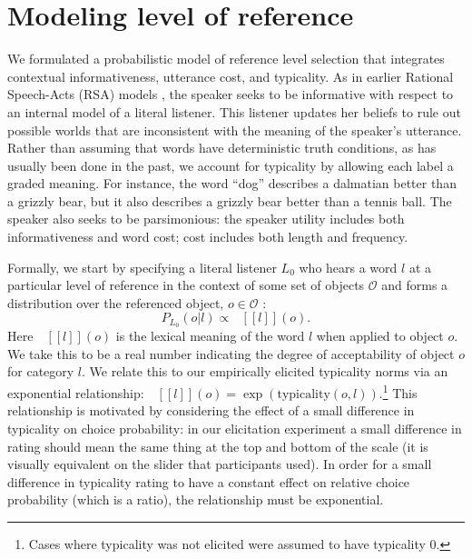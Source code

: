 \documentclass[10pt,letterpaper]{article}
\newcommand{\denote}[1]{\mbox{ $[\![ #1 ]\!]$}}
\begin{document}

\section{\bf Modeling level of reference}

We formulated a probabilistic model of reference level selection that integrates contextual informativeness, utterance cost, and typicality.
As in earlier Rational Speech-Acts (RSA) models \cite{frank2012, goodmanstuhlmueller2013}, the speaker seeks to be informative with respect to an internal model of a literal listener. This listener updates her beliefs to rule out possible worlds that are inconsistent with the meaning of the speaker's utterance. Rather than assuming that words have deterministic truth conditions, as has usually been done in the past, we account for typicality by allowing each label a graded meaning. For instance, the word ``dog'' describes a dalmatian better than a grizzly bear, but it also describes a grizzly bear better than a tennis ball.
The speaker also seeks to be parsimonious: the speaker utility includes both informativeness and word cost; cost includes both length and frequency.

Formally, we start by specifying a literal listener $L_0$ who hears a word $l$ at a particular level of reference  in the context of some set of objects $\mathcal{O}$ and forms a distribution over the referenced object, $o \in \mathcal{O}$ : 
$$P_{L_0}(o | l) \propto \denote{l}(o).$$
Here $\denote{l}(o)$ is the lexical meaning of the word $l$ when applied to object $o$. We take this to be a real number indicating the degree of acceptability of object $o$ for category $l$. 
We relate this to our empirically elicited typicality norms via an exponential relationship: $\denote{l}(o)=\exp(\text{typicality}(o,l))$.\footnote{Cases where typicality was not elicited were assumed to have typicality $0$.}
This relationship is motivated by considering the effect of a small difference in typicality on choice probability: in our elicitation experiment a small difference in rating should mean the same thing at the top and bottom of the scale (it is visually equivalent on the slider that participants used).
In order for a small difference in typicality rating to have a constant effect on relative choice probability (which is a ratio), the relationship must be exponential. 
\end{document}
